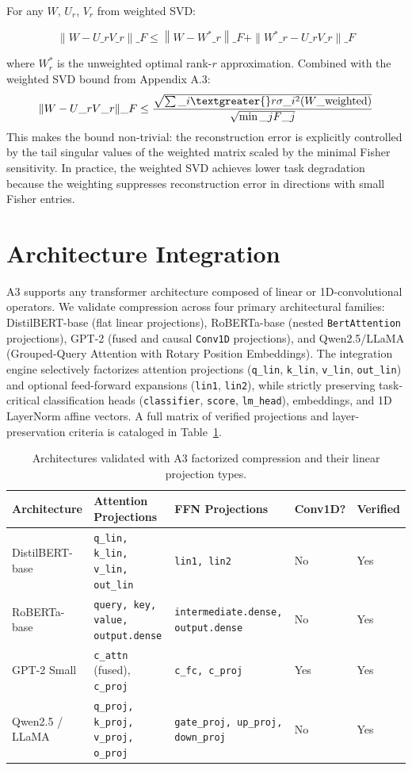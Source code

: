 For any $W$, $U_r$, $V_r$ from weighted SVD:

\[
\|W - U\_r V\_r\|\_F \leq \left\|W - W^*\_r\right\|\_F + \|W^*\_r - U\_r V\_r\|\_F
\tag{4.14}
\]

where $W^*_r$ is the unweighted optimal rank-$r$ approximation. Combined with the weighted SVD bound from Appendix A.3:
\[
\|W - U\_r V\_r\|\_F \leq \frac{\sqrt{\sum\_{i \textgreater{} r} \sigma\_i^2(W\_\text{weighted})}}{\sqrt{\min\_j F\_j}}
\]
This makes the bound non-trivial: the reconstruction error is explicitly controlled by the tail singular values of the weighted matrix scaled by the minimal Fisher sensitivity. In practice, the weighted SVD achieves lower task degradation because the weighting suppresses reconstruction error in directions with small Fisher entries.


\section{Architecture Integration}
\label{sec:architecture}

A3 supports any transformer architecture composed of linear or 1D-convolutional operators. We validate compression across four primary architectural families: DistilBERT-base (flat linear projections), RoBERTa-base (nested \texttt{BertAttention} projections), GPT-2 (fused and causal \texttt{Conv1D} projections), and Qwen2.5/LLaMA (Grouped-Query Attention with Rotary Position Embeddings). The integration engine selectively factorizes attention projections (\texttt{q\_lin}, \texttt{k\_lin}, \texttt{v\_lin}, \texttt{out\_lin}) and optional feed-forward expansions (\texttt{lin1}, \texttt{lin2}), while strictly preserving task-critical classification heads (\texttt{classifier}, \texttt{score}, \texttt{lm\_head}), embeddings, and 1D LayerNorm affine vectors. A full matrix of verified projections and layer-preservation criteria is cataloged in Table~\ref{tab:architecture_support}.

\begin{table}[t]
\centering
\small
\begin{tabular}{lllll}
\toprule
\textbf{Architecture} & \textbf{Attention Projections} & \textbf{FFN Projections} & \textbf{Conv1D?} & \textbf{Verified} \\
\midrule
DistilBERT-base & \texttt{q\_lin, k\_lin, v\_lin, out\_lin} & \texttt{lin1, lin2} & No & Yes \\
RoBERTa-base & \texttt{query, key, value, output.dense} & \texttt{intermediate.dense, output.dense} & No & Yes \\
GPT-2 Small & \texttt{c\_attn} (fused), \texttt{c\_proj} & \texttt{c\_fc, c\_proj} & Yes & Yes \\
Qwen2.5 / LLaMA & \texttt{q\_proj, k\_proj, v\_proj, o\_proj} & \texttt{gate\_proj, up\_proj, down\_proj} & No & Yes \\
\bottomrule
\end{tabular}
\caption{Architectures validated with A3 factorized compression and their linear projection types.}
\label{tab:architecture_support}
\end{table}

